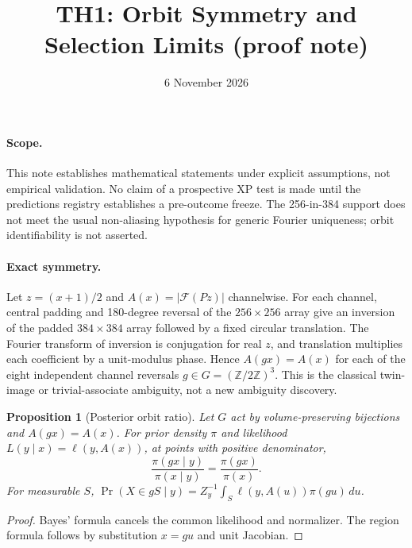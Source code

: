 \documentclass[11pt]{article}
\title{TH1: Orbit Symmetry and Selection Limits (proof note)}
\date{6 November 2026}
\newtheorem{proposition}{Proposition}
\begin{document}
\maketitle
\paragraph{Scope.} This note establishes mathematical statements under explicit assumptions, not empirical validation. No claim of a prospective XP test is made until the predictions registry establishes a pre-outcome freeze. The 256-in-384 support does not meet the usual non-aliasing hypothesis for generic Fourier uniqueness; orbit identifiability is not asserted.
\paragraph{Exact symmetry.} Let $z=(x+1)/2$ and $A(x)=|\mathcal F(Pz)|$ channelwise. For each channel, central padding and 180-degree reversal of the $256\times256$ array give an inversion of the padded $384\times384$ array followed by a fixed circular translation. The Fourier transform of inversion is conjugation for real $z$, and translation multiplies each coefficient by a unit-modulus phase. Hence $A(gx)=A(x)$ for each of the eight independent channel reversals $g\in G=(\mathbb Z/2\mathbb Z)^3$. This is the classical twin-image or trivial-associate ambiguity, not a new ambiguity discovery.
\begin{proposition}[Posterior orbit ratio]
Let $G$ act by volume-preserving bijections and $A(gx)=A(x)$. For prior density $\pi$ and likelihood $L(y\mid x)=\ell(y,A(x))$, at points with positive denominator,
\[
\frac{\pi(gx\mid y)}{\pi(x\mid y)}=\frac{\pi(gx)}{\pi(x)}.
\]
For measurable $S$, $\Pr(X\in gS\mid y)=Z_y^{-1}\int_S\ell(y,A(u))\pi(gu)\,du$.
\end{proposition}
\begin{proof}Bayes' formula cancels the common likelihood and normalizer. The region formula follows by substitution $x=gu$ and unit Jacobian.\end{proof}
\end{document}
